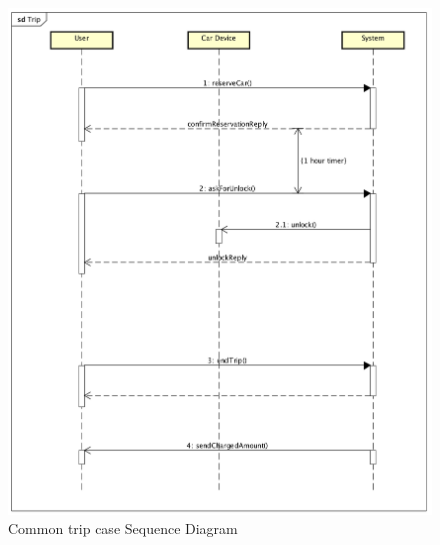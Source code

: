 \begin{figure}[H]
	\centering
	\includegraphics[width = \textwidth]{img/sequence_trip}
	\caption{Common trip case Sequence Diagram}
\end{figure}





